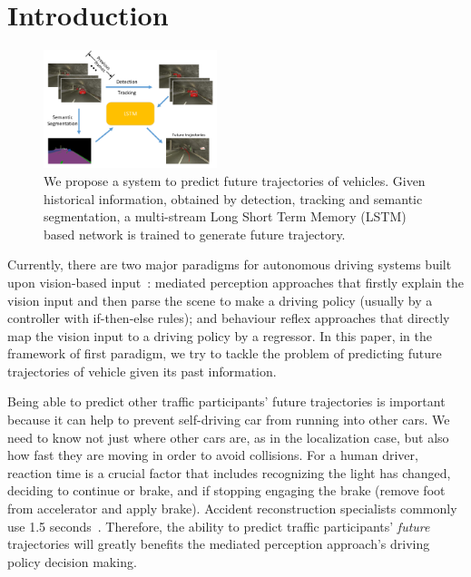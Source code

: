 \documentclass[10pt,twocolumn,letterpaper]{article}
\begin{document}
\section{Introduction}
\begin{figure}[t]
        \centering
        \includegraphics[width=0.45\textwidth]{figures/pull_figure.pdf}
        \caption{ {
        We propose a system to predict future trajectories of vehicles. Given historical information, obtained by detection, tracking and semantic segmentation, a multi-stream Long Short Term Memory (LSTM)  based network is trained to generate future trajectory.}}
        \label{fig:pull_figure}
\end{figure}

Currently, there are two major paradigms for autonomous driving systems built upon vision-based input~\cite{chen2015deepdriving}: mediated perception approaches that firstly explain the vision input and then parse the scene to make a driving policy (usually by a controller with if-then-else rules); and behaviour reflex approaches that directly map the vision input to a driving policy by a regressor.
In this paper, in the framework of first paradigm, we try to tackle the problem of predicting future trajectories of vehicle given its past information.


 Being able to predict other traffic participants' future trajectories is important because it can help to prevent self-driving car from running into other cars. We need to know not just where other cars are, as in the localization case, but also how fast they are moving in order to avoid collisions.
For a human driver, reaction time is a crucial factor that includes recognizing the light has changed, deciding to continue or brake, and if stopping engaging the brake (remove foot from accelerator and apply brake). Accident reconstruction specialists commonly use 1.5 seconds~\cite{mcgehee2000driver}.
Therefore, the ability to predict traffic participants' \emph{future} trajectories will greatly benefits the mediated perception approach's driving policy decision making.
\end{document}
